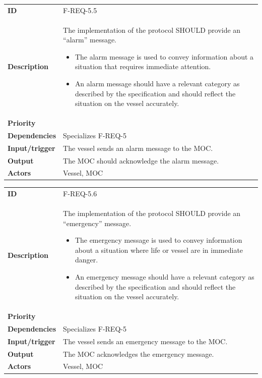 \begin{table}[H]
	\centering
	\begin{tabularx}{\textwidth}{ l X }
		\rowcolor[HTML]{E7E7E7}
		\textbf{ID} & F-REQ-5.5 \\
		\textbf{Description} & The implementation of the protocol SHOULD provide an “alarm” message.
		\begin{itemize}
			\item The alarm message is used to convey information about a situation that requires immediate attention.
			\item An alarm message should have a relevant category as described by the specification and should reflect the situation on the vessel accurately.
		\end{itemize} \\
		\rowcolor[HTML]{E7E7E7}
		\textbf{Priority} & \priohigh \\
		\textbf{Dependencies} & Specializes F-REQ-5 \\
		\rowcolor[HTML]{E7E7E7}
		\textbf{Input/trigger} & The vessel sends an alarm message to the MOC. \\
		\textbf{Output} & The MOC should acknowledge the alarm message. \\
		\rowcolor[HTML]{E7E7E7}
		\textbf{Actors} & Vessel, MOC \\
	\end{tabularx}
	\label{table:f-req-5.5}
\end{table}

\begin{table}[H]
	\centering
	\begin{tabularx}{\textwidth}{ l X }
		\rowcolor[HTML]{E7E7E7}
		\textbf{ID} & F-REQ-5.6 \\
		\textbf{Description} & The implementation of the protocol SHOULD provide an “emergency” message.
		\begin{itemize}
			\item The emergency message is used to convey information about a situation where life or vessel are in immediate danger.
			\item An emergency message should have a relevant category as described by the specification and should reflect the situation on the vessel accurately.
		\end{itemize} \\
		\rowcolor[HTML]{E7E7E7}
		\textbf{Priority} & \priohigh \\
		\textbf{Dependencies} & Specializes F-REQ-5 \\
		\rowcolor[HTML]{E7E7E7}
		\textbf{Input/trigger} & The vessel sends an emergency message to the MOC. \\
		\textbf{Output} & The MOC acknowledges the emergency message. \\
		\rowcolor[HTML]{E7E7E7}
		\textbf{Actors} & Vessel, MOC \\
	\end{tabularx}
	\label{table:f-req-5.6}
\end{table}

